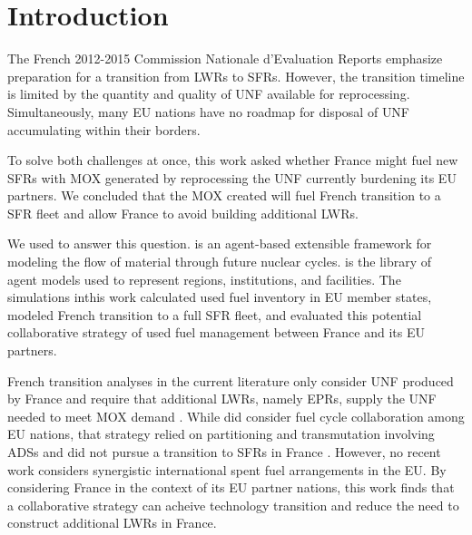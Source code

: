
\section{Introduction}
The French 2012-2015 Commission Nationale d'Evaluation Reports
\cite{cne2_reports_2015} emphasize preparation for a transition from \glspl{LWR} to \glspl{SFR}.
However, the transition timeline is limited by the quantity and quality 
of \gls{UNF} available for reprocessing. Simultaneously, many \gls{EU} nations 
have no roadmap for disposal of \gls{UNF} accumulating within their borders.

To solve both challenges at once, this work asked whether France might fuel new 
\glspl{SFR} with \gls{MOX} generated by reprocessing the \gls{UNF} currently 
burdening its \gls{EU} partners. We concluded that the \gls{MOX} created will 
fuel French transition to a \gls{SFR} fleet and allow France to avoid building 
additional \glspl{LWR}.

We used \Cyclus \cite{huff_fundamental_2016} to answer this question. 
\Cyclus is an agent-based extensible framework for modeling the flow of 
material through future nuclear cycles.  \Cycamore is the library of agent 
models used to represent regions, institutions, and facilities. The simulations 
inthis work calculated used fuel inventory in \gls{EU} member states, modeled French 
transition to a full \gls{SFR} fleet, and evaluated this potential collaborative
strategy of used fuel management between France and its \gls{EU} partners.

French transition analyses in the current literature only consider \gls{UNF} 
produced by France and require that additional \glspl{LWR},
namely \glspl{EPR}, supply the \gls{UNF} needed to meet \gls{MOX} demand \cite{carre_overview_2009, martin_symbiotic_2017, freynet_multiobjective_2016}.
While \cite{fazio_study_2013} did consider fuel cycle collaboration among \gls{EU} 
nations, that strategy relied on partitioning and transmutation
involving \glspl{ADS} and did not pursue a transition to \glspl{SFR} in France \cite{fazio_study_2013}.
However, no recent work considers synergistic international spent fuel 
arrangements in the \gls{EU}.
By considering France in the context of its \gls{EU} partner nations, this work 
finds that a collaborative strategy can acheive technology transition and 
reduce the need to construct additional \glspl{LWR} in France.
